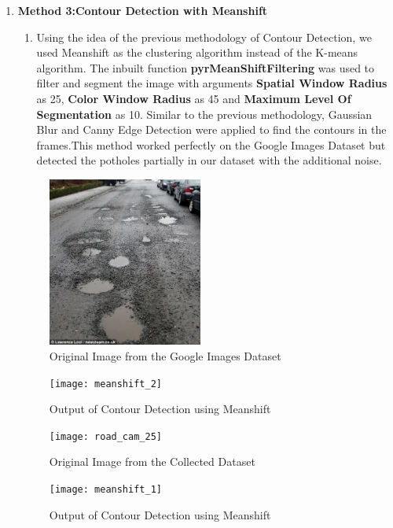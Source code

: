 \begin{enumerate}
\begin{enumerate}
    \item \textbf{Method 3:Contour Detection with Meanshift}
    \begin{enumerate}
        \item Using the idea of the previous methodology of Contour Detection, we used Meanshift as the clustering algorithm instead of the K-means algorithm. The inbuilt function \textbf{pyrMeanShiftFiltering} was used to filter and segment the image with arguments \textbf{Spatial Window Radius} as 25, \textbf{Color Window Radius} as 45 and \textbf{Maximum Level Of Segmentation} as 10. Similar to the previous methodology, Gaussian Blur and Canny Edge Detection were applied to find the contours in the frames.This method worked perfectly on the Google Images Dataset but detected the potholes partially in our dataset with the additional noise.
    \end{enumerate}
    \pagebreak
    
    \begin{figure}[ht!]
        \centering
        \includegraphics[width = 2in]{road_10}
        \caption{Original Image from the Google Images Dataset}
    \end{figure}

    \begin{figure}[ht!]
        \centering
        \texttt{[image: meanshift\_2]}
        \caption{Output of Contour Detection using Meanshift}
    \end{figure}
    \pagebreak
    
    \begin{figure}[ht!]
        \centering
        \texttt{[image: road\_cam\_25]}
        \caption{Original Image from the Collected Dataset}
    \end{figure}

    \begin{figure}[ht!]
        \centering
        \texttt{[image: meanshift\_1]}
        \caption{Output of Contour Detection using Meanshift}
    \end{figure}
    \pagebreak


\end{enumerate}
\end{enumerate}
